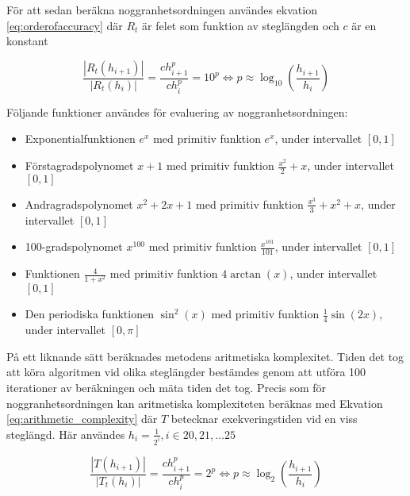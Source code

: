 \documentclass[a4paper,titlepage]{article}
\begin{document}
För att sedan beräkna noggranhetsordningen användes ekvation \ref{eq:orderofaccuracy} där $R_t$
är felet som funktion av steglängden och $c$ är en konstant

\begin{equation}
    \label{eq:orderofaccuracy}
    \frac{| R_t(h_{i+1})|}{| R_t(h_{i})|}  = \frac{ch_{i+1}^p}{ch_{i}^p} = 10^p
    \Leftrightarrow p \approx \log_{10}\left( \frac{h_{i+1}}{h_i} \right)
\end{equation}

Följande funktioner användes för evaluering av noggranhetsordningen:

\begin{itemize}
    \item Exponentialfunktionen $e^x$ med primitiv funktion $e^x$, under intervallet $[0, 1]$
    \item Förstagradspolynomet $x + 1$ med primitiv funktion $\frac{x^2}{2} + x$, under intervallet $[0, 1]$
    \item Andragradspolynomet $x^2 + 2x + 1$ med primitiv funktion
        $\frac{x^3}{3} + x^2 + x$, under intervallet $[0, 1]$
    \item 100-gradspolynomet $x^{100}$ med primitiv funktion
        $\frac{x^{101}}{101}$, under intervallet $[0, 1]$
    \item Funktionen $\frac{4}{1 + x^2}$ med primitiv funktion $4\arctan(x)$, under intervallet $[0, 1]$
    \item Den periodiska funktionen $\sin^2(x)$ med primitiv funktion
        $\frac{1}{4}\sin(2x)$, under intervallet $[0, \pi]$
\end{itemize}


På ett liknande sätt beräknades metodens aritmetiska komplexitet. Tiden det tog att köra
algoritmen vid olika steglängder bestämdes genom att utföra 100 iterationer av beräkningen
och mäta tiden det tog. Precis som för noggranhetsordningen kan aritmetiska komplexiteten
beräknas med Ekvation \ref{eq:arithmetic_complexity} där $T$ betecknar exekveringstiden
vid en viss steglängd. Här användes $h_i = \frac{1}{2^i}, i \in {20,21, \dots 25}$

\begin{equation}
    \label{eq:arithmetic_complexity}
    \frac{| T(h_{i+1})|}{| T_t(h_{i})|}  = \frac{ch_{i+1}^p}{ch_{i}^p} = 2^p
    \Leftrightarrow p \approx \log_{2}\left( \frac{h_{i+1}}{h_i} \right)
\end{equation}
\end{document}
